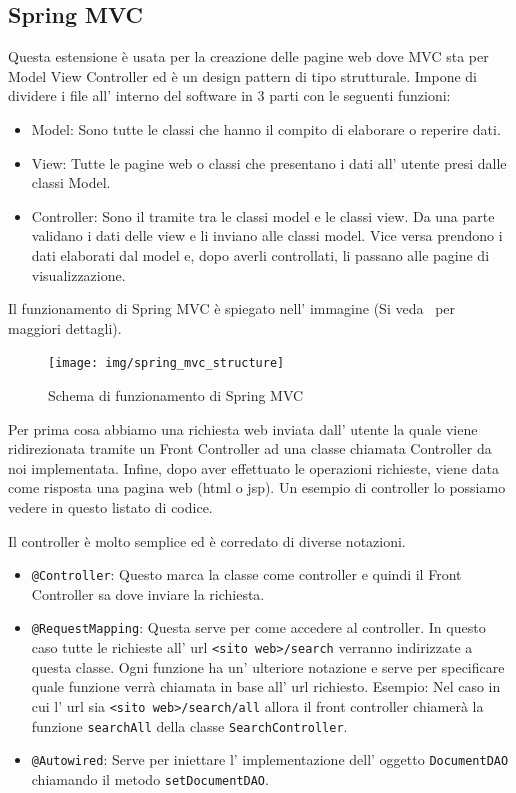 \documentclass[12pt]{book}
\begin{document}
\subsection{Spring MVC}
Questa estensione è usata per la creazione delle pagine web dove MVC sta per 
Model View Controller ed è un design pattern di tipo strutturale.
Impone di dividere i file all' interno del software in 3 parti con le seguenti 
funzioni:
\begin{itemize}
    \item Model: Sono tutte le classi che hanno 
        il compito di elaborare o reperire dati.
    \item View: Tutte le pagine web o classi che presentano
        i dati all' utente presi dalle classi Model.
    \item Controller: Sono il tramite tra le classi model e le classi
        view. Da una parte validano i dati delle view e li inviano alle 
        classi model. Vice versa prendono i dati elaborati dal model e, dopo 
        averli controllati, li passano alle pagine di visualizzazione.
\end{itemize}
Il funzionamento di Spring MVC è spiegato nell' immagine 
(Si veda~\cite{apress:introducing_spring_framework} per maggiori dettagli).
\begin{figure}[H]
    \centering
    \texttt{[image: img/spring\_mvc\_structure]}
    \caption{Schema di funzionamento di Spring MVC}\label{spring:diagram}
\end{figure}
Per prima cosa abbiamo una richiesta web inviata dall' utente la quale viene 
ridirezionata tramite un Front Controller ad una classe chiamata Controller da 
noi implementata.
Infine, dopo aver effettuato le operazioni richieste, viene data come risposta 
una pagina web (html o jsp).
Un esempio di controller lo possiamo vedere in questo listato di codice.

Il controller è molto semplice ed è corredato di diverse notazioni.
\begin{itemize}
    \item \texttt{@Controller}: Questo marca la classe come controller e quindi
        il Front Controller sa dove inviare la richiesta.
    \item \texttt{@RequestMapping}: Questa serve per come accedere al controller.
        In questo caso tutte le richieste all' url \texttt{<sito web>/search}
        verranno indirizzate a questa classe.
        Ogni funzione ha un' ulteriore notazione e serve per specificare quale
        funzione verrà chiamata in base all' url richiesto.
        Esempio: Nel caso in cui l' url sia \texttt{<sito web>/search/all} 
        allora il front controller chiamerà la funzione \texttt{searchAll}
        della classe \texttt{SearchController}.
    \item \texttt{@Autowired}: Serve per iniettare l' implementazione dell' 
        oggetto \texttt{DocumentDAO} chiamando il metodo 
        \texttt{setDocumentDAO}\@.
\end{itemize}
\end{document}
